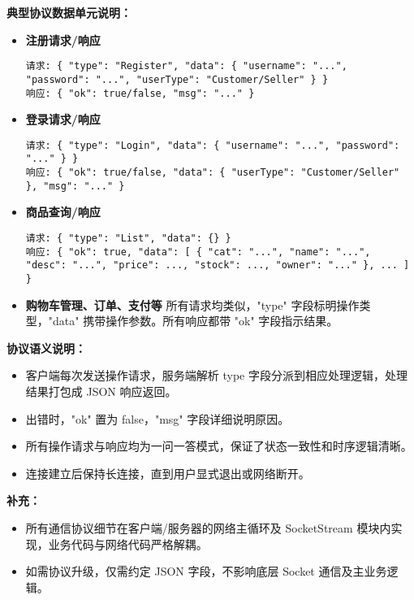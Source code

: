\documentclass[11pt]{article}
\begin{document}
\vspace{0.5em}
\textbf{典型协议数据单元说明：}

\begin{itemize}
    \item \textbf{注册请求/响应}
\begin{verbatim}
请求: { "type": "Register", "data": { "username": "...", "password": "...", "userType": "Customer/Seller" } }
响应: { "ok": true/false, "msg": "..." }
\end{verbatim}

    \item \textbf{登录请求/响应}
\begin{verbatim}
请求: { "type": "Login", "data": { "username": "...", "password": "..." } }
响应: { "ok": true/false, "data": { "userType": "Customer/Seller" }, "msg": "..." }
\end{verbatim}

    \item \textbf{商品查询/响应}
\begin{verbatim}
请求: { "type": "List", "data": {} }
响应: { "ok": true, "data": [ { "cat": "...", "name": "...", "desc": "...", "price": ..., "stock": ..., "owner": "..." }, ... ] }
\end{verbatim}

    \item \textbf{购物车管理、订单、支付等}  
所有请求均类似，"type" 字段标明操作类型，"data" 携带操作参数。所有响应都带 "ok" 字段指示结果。
\end{itemize}

\vspace{0.5em}
\textbf{协议语义说明：}
\begin{itemize}
    \item 客户端每次发送操作请求，服务端解析 type 字段分派到相应处理逻辑，处理结果打包成 JSON 响应返回。
    \item 出错时，"ok" 置为 false，"msg" 字段详细说明原因。
    \item 所有操作请求与响应均为一问一答模式，保证了状态一致性和时序逻辑清晰。
    \item 连接建立后保持长连接，直到用户显式退出或网络断开。
\end{itemize}

\vspace{0.5em}
\textbf{补充：}
\begin{itemize}
    \item 所有通信协议细节在客户端/服务器的网络主循环及 SocketStream 模块内实现，业务代码与网络代码严格解耦。
    \item 如需协议升级，仅需约定 JSON 字段，不影响底层 Socket 通信及主业务逻辑。
\end{itemize}
\end{document}
